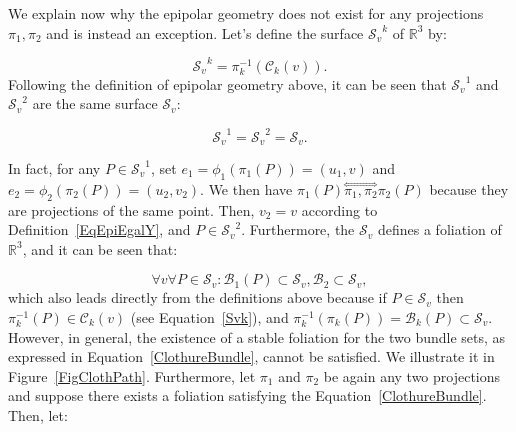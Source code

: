 \documentclass{ipol}
\newcommand{\RR}{\ensuremath{\mathbb{R}}}
\newcommand{\HComp}{\overset{\Longleftrightarrow}{\scriptscriptstyle \pi_1,\pi_2}}
\newcommand{\Bund}[1]{\ensuremath{\mathcal{B}_{#1}}}
\newcommand{\BundO}{\Bund{1}}
\newcommand{\BundT}{\Bund{2}}
\newcommand{\BundK}{\Bund{k}}
\newcommand{\CurveE}[1]{\ensuremath{\mathcal{C}_{#1}}}
\newcommand{\CurveK}{\CurveE{k}}
\newcommand{\Sv}{\ensuremath{\mathcal{S}_{v}}}
\begin{document}
%
%

We explain now why the epipolar geometry does not exist for any projections $\pi_1,\pi_2$ and is instead an exception. Let's define the surface $\Sv^k$ of $\RR^3$ by:

\begin{equation}
   \Sv^k = \pi_k^{-1}(\CurveK(v)).  \label{Svk}
\end{equation}
Following the definition of {epipolar geometry} above, it can be seen that $\Sv^1$ and $\Sv^2$ are the same surface $\Sv$:

\begin{equation}
   \Sv^1 = \Sv^2 = \Sv.
\end{equation}

In fact, for any $P\in\Sv^1$, set  $e_1=\phi_1(\pi_1(P))=(u_1,v)$
and $e_2=\phi_2(\pi_2(P))=(u_2,{v_2})$. We then have $\pi_1(P) \HComp \pi_2(P)$ because they are projections
of the same point. Then, $v_2=v$ according to Definition~\ref{EqEpiEgalY}, and $P \in \Sv^2$. Furthermore, the $\Sv$ defines a foliation of $\RR^3$, and it can be seen that:

\begin{equation}
   \forall v \forall P \in \Sv :  \BundO(P) \subset \Sv , \BundT \subset \Sv, \label{ClothureBundle}
\end{equation}
which also leads directly from the definitions above because if $P \in \Sv$ then $\pi_k^{-1}(P) \in \CurveK(v)$
(see Equation~\eqref{Svk}), and $\pi_k^{-1}(\pi_k(P)) = \BundK(P) \subset \Sv$.
%
However, in general, the existence of a stable foliation for the two bundle sets, as expressed in Equation~\eqref{ClothureBundle},
cannot  be satisfied. We illustrate it 
in Figure~\ref{FigClothPath}.  Furthermore, let $\pi_1$ and $\pi_2$ be again any two  projections and suppose
there exists  a foliation satisfying the Equation~\eqref{ClothureBundle}. Then, let: 
\end{document}
